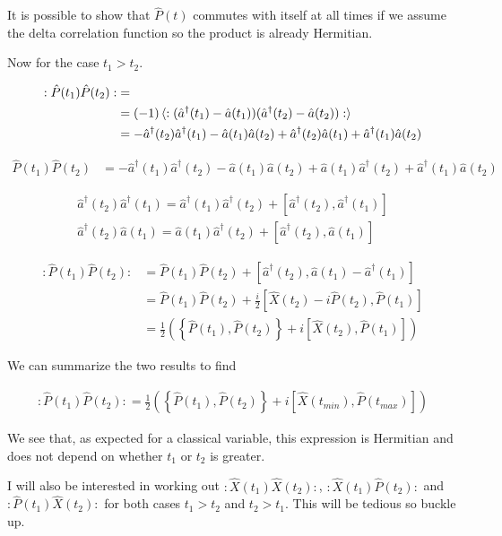\documentclass[12pt]{article}
\newcommand{\ahat}{\hat{a}}
\newcommand{\adag}{\ahat^{\dag}}
\begin{document}
It is possible to show that $\hat{P}(t)$ commutes with itself at all times if we assume the delta correlation function so the product is already Hermitian.

Now for the case $t_1>t_2$.

\begin{align}
:\hat{P}(t_1)\hat{P}(t_2): &=\\
&= (-1)\braket{:(\adag(t_1)-\ahat(t_1))(\adag(t_2)-\ahat(t_2)):}\\
&=-\adag(t_2)\adag(t_1) - \ahat(t_1)\ahat(t_2) + \adag(t_2)\ahat(t_1)+\adag(t_1)\ahat(t_2)
\end{align}

\begin{align}
\hat{P}(t_1)\hat{P}(t_2)&=
-\adag(t_1)\adag(t_2) - \ahat(t_1)\ahat(t_2) + \ahat(t_1)\adag(t_2) + \adag(t_1)\ahat(t_2)
\end{align}

\begin{align}\adag(t_2)\adag(t_1) = \adag(t_1)\adag(t_2)+[\adag(t_2),\adag(t_1)]\\
\adag(t_2)\ahat(t_1) = \ahat(t_1)\adag(t_2)+[\adag(t_2),\ahat(t_1)]
\end{align}

\begin{align}
:\hat{P}(t_1)\hat{P}(t_2): &= \hat{P}(t_1)\hat{P}(t_2) + [\adag(t_2), \ahat(t_1)-\adag(t_1)]\\
&= \hat{P}(t_1)\hat{P}(t_2) + \frac{i}{2}[\hat{X}(t_2)-i \hat{P}(t_2),\hat{P}(t_1)]\\
&= \frac{1}{2}\left(\left\{\hat{P}(t_1),\hat{P}(t_2)\right\} + i \left[\hat{X}(t_2),\hat{P}(t_1)\right]\right)
\end{align}

We can summarize the two results to find

\begin{align}
:\hat{P}(t_1)\hat{P}(t_2): = \frac{1}{2}\left(\left\{\hat{P}(t_1),\hat{P}(t_2)\right\} + i \left[\hat{X}(t_{min}),\hat{P}(t_{max})\right]\right)
\end{align}

We see that, as expected for a classical variable, this expression is Hermitian and does not depend on whether $t_1$ or $t_2$ is greater.

I will also be interested in working out $:\hat{X}(t_1)\hat{X}(t_2):$, $:\hat{X}(t_1)\hat{P}(t_2):$ and $:\hat{P}(t_1)\hat{X}(t_2):$ for both cases $t_1>t_2$ and $t_2>t_1$. This will be tedious so buckle up.

\pagebreak
\end{document}
